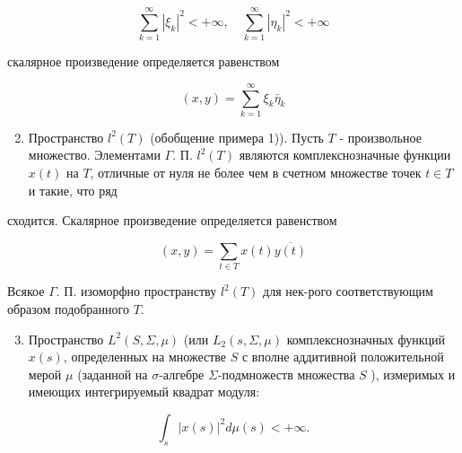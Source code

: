 \documentclass[10pt]{article}
\begin{document}
\[

\sum_{k=1}^{\infty}\left|\xi_{k}\right|^{2}<+\infty, \quad \sum_{k=1}^{\infty}\left|\eta_{k}\right|^{2}<+\infty

\]



скалярное произведение определяется равенством



\[

(x, y)=\sum_{k=1}^{\infty} \xi_{k} \bar{\eta}_{k}

\]



\begin{enumerate}

  \setcounter{enumi}{1}

  \item Пространство $l^{2}(T)$ (обобщение примера 1)). Пусть $T$ - произвольное множество. Элементами $\Gamma$. П. $l^{2}(T)$ являются комплекснозначные функции $x(t)$ на $T$, отличные от нуля не более чем в счетном множестве точек $t \in T$ и такие, что ряд

\end{enumerate}



сходится. Скалярное произведение определяется равенством



\[

(x, y)=\sum_{t \in T} x(t) \overline{y(t)}

\]



Всякое $\Gamma$. П. изоморфно пространству $l^{2}(T)$ для нек-рого соответствующим образом подобранного $T$.



\begin{enumerate}

  \setcounter{enumi}{2}

  \item Пространство $L^{2}(S, \Sigma, \mu)$ (или $L_{2}(s, \Sigma, \mu)$ комплекснозначных функций $x(s)$, определенных на множестве $S$ с вполне аддитивной положительной мерой $\mu$ (заданной на $\sigma$-алгебре $\Sigma$-подмножеств множества $S$ ), измеримых и имеющих интегрируемый квадрат модуля:

\end{enumerate}



\[

\int_{s}|x(s)|^{2} d \mu(s)<+\infty .

\]
\end{document}
